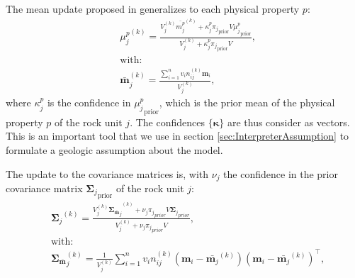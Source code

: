 \documentclass[extra, mreferee]{gji_joint} %
\begin{document}

The mean update proposed in \citet{ggz389} generalizes to each physical property $p$:
\begin{align}
&{\mu_j^p}^{(k)}=\frac{V_{j}^{(k)}{\bar{{m}^p_j}}^{(k)} + \kappa^p_j {\pi_j}_{\text{prior}} V {\mu^p_j}_{\text{prior}}}{V_{j}^{(k)}+\kappa_j^p {\pi_j}_{\text{prior}} V} \label{eq:mu_update},\\
&\text{with:} \nonumber\\
&{\bar{\mathbf{m}}}_j^{(k)} = \frac{\sum^n_{i=1} v_i n_{ij}^{(k)} \mathbf{m}_i}{V_{j}^{(k)}},
\end{align}
where $\kappa_j^p$ is the confidence in ${{\mu^p_j}_{\text{prior}}}$, which is the prior mean of the physical property $p$ of the rock unit $j$. The confidences $\{\mathbf{\kappa}\}$ are thus consider as vectors. This is an important tool that we use in section \ref{sec:InterpreterAssumption} to formulate a geologic assumption about the model.

The update to the covariance matrices is, with $\nu_j$ the confidence in the prior covariance matrix ${\mathbf{\Sigma}_j}_{\text{prior}}$ of the rock unit $j$:
\begin{align}
&{\mathbf{\Sigma}_j}^{(k)} = \frac{{{V_{j}^{(k)}} {\mathbf{\Sigma}_{\bar{\mathbf{m}}}}_j}^{(k)} + \nu_j {\pi_j}_{prior} V {\mathbf{\Sigma}_j}_{prior}}
{{V_{j}^{(k)}} + \nu_j {\pi_j}_{prior} V} \label{eq:sig_update},\\
&\text{with:} \nonumber\\
&{\mathbf{\Sigma}_{\bar{\mathbf{m}}}}_j^{(k)} =\frac{1}{{V_{j}^{(k)}}} \sum_{i=1}^{n} v_i n_{ij}^{(k)}(\mathbf{m}_i-\bar{\mathbf{m}_j}^{(k)})(\mathbf{m}_i-\bar{\mathbf{m}_j}^{(k)})^\top,
\end{align}

\end{document}
